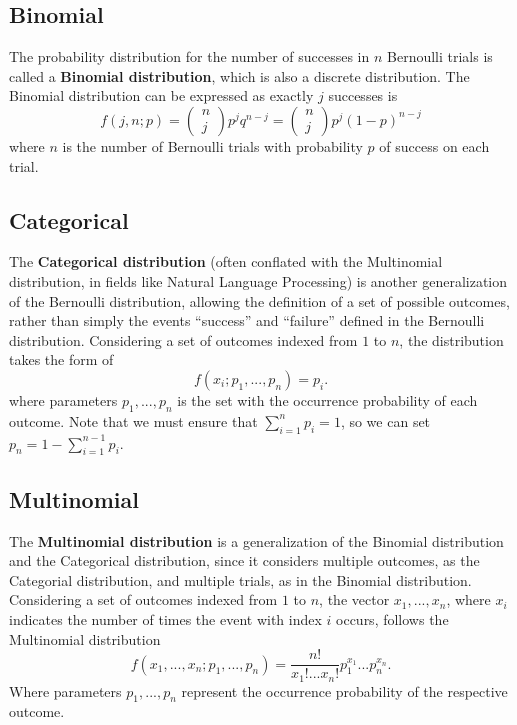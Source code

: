 \subsection{\label{binomial} Binomial}
The probability distribution for the number of successes in $n$ Bernoulli trials is called a {\bf Binomial distribution}, which is also a discrete distribution. The Binomial distribution can be expressed as 
exactly $j$ successes is 
\begin{equation*}
f(j,n;p)= \left(\begin{array}{c}
n \\
j \end{array}\right) p^{j}q^{n-j} = \left(\begin{array}{c}
n \\
j \end{array}\right) p^{j}(1-p)^{n-j}
\end{equation*}
where $n$ is the number of Bernoulli trials with probability $p$ of success on each trial.

\subsection{\label{categorical} Categorical}
The \textbf{Categorical distribution} (often conflated with the Multinomial distribution, in fields like Natural Language Processing) is another generalization of the Bernoulli distribution, allowing the definition of a set of possible outcomes, rather than simply the events ``success'' and ``failure'' defined in the Bernoulli distribution. Considering a set of outcomes indexed from $1$ to $n$, the distribution takes the form of
\begin{equation*}
f(x_i;p_1,...,p_n) = p_i.
\end{equation*}
where parameters $p_1,...,p_n$ is the set with the occurrence probability of each outcome. Note that we must ensure that $\sum_{i=1}^np_i=1$, so we can set $p_n = 1 - \sum_{i=1}^{n-1}p_i$.

\subsection{\label{multinomial} Multinomial}

The \textbf{Multinomial distribution} is a generalization of the Binomial distribution and the Categorical distribution, since it considers multiple outcomes, as the Categorial distribution, and multiple trials, as in the Binomial distribution.
Considering a set of outcomes indexed from $1$ to $n$, the vector $x_1,...,x_n$, where $x_i$ indicates the number of times the event with index $i$ occurs, follows the Multinomial distribution
\begin{equation*}
f(x_1,...,x_n;p_1,...,p_n) = \frac{n!}{x_{1}!...x_{n}!} p_{1}^{x_{1}}...p_{n}^{x_{n}}.
\end{equation*}
Where parameters $p_1,...,p_n$ represent the occurrence probability of the respective outcome.


